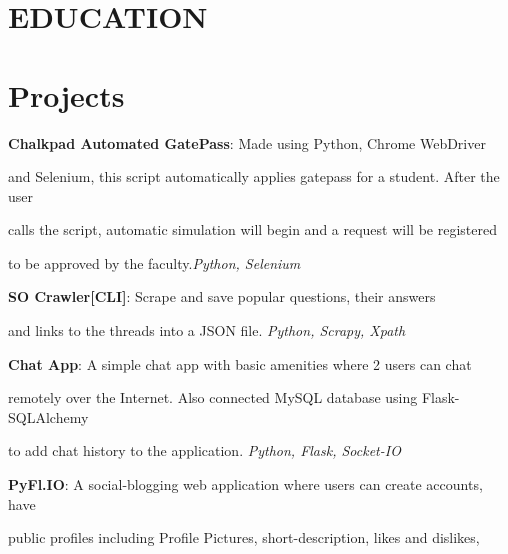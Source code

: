 \documentclass{ss_resume}
\date{\displaydate{date}}
\begin{document}
\makecvtitle


\section{EDUCATION}


\section{Projects}

\medskip

\textbf{Chalkpad Automated GatePass}: Made using Python, Chrome WebDriver

and Selenium, this script automatically applies gatepass for a student. After the user

calls the script, automatic simulation will begin and a request will be registered

to be approved by the faculty.\hfill \textit{Python, Selenium}

\medskip

\textbf{SO Crawler[CLI]}: Scrape and save popular questions, their answers

and links to the threads into a JSON file. \hfill \textit{Python, Scrapy, Xpath}

\medskip

\textbf{Chat App}: A simple chat app with basic amenities where 2 users can chat

remotely over the Internet. Also connected MySQL database using Flask-SQLAlchemy

to add chat history to the application. \hfill \textit{Python, Flask, Socket-IO}

\medskip

\textbf{PyFl.IO}: A social-blogging web application where users can create accounts, have

public profiles including Profile Pictures, short-description, likes and dislikes,
\end{document}
